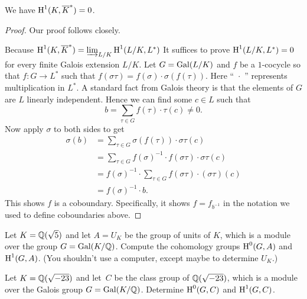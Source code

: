 \begin{theorem}[Hilbert 90]\label{thm:h90}
	We have $\operatorname{H}^1(K,\overline{K}^*) = 0$.
\end{theorem}
\begin{proof}
	Our proof follows \cite[pg.~150]{serre:localfields} closely.

	Because $\operatorname{H}^1(K,\overline{K}^*) = \varinjlim_{L/K} \operatorname{H}^1(L/K,L^*)$
	It suffices to prove $\operatorname{H}^1(L/K,L^*) = 0$ for every finite
	Galois extension $L/K$.
	Let $G = \operatorname{Gal}(L/K)$ and $f$ be a $1$-cocycle so that $f:G \to L^*$
	such that $f(\sigma\tau) = f(\sigma)\cdot\sigma(f(\tau))$. Here
	``~$\cdot$~'' represents multiplication in $L^*$.
	A standard fact from Galois theory is that the elements of
	$G$ are $L$ linearly independent. Hence we can find
	some $c\in L$ such that
	$$
	b = \sum_{\tau\in G} f(\tau)\cdot\tau(c) \neq 0.
	$$
	Now apply $\sigma$ to both sides to get
	\begin{align*}
		\sigma(b)
		&=
		\sum_{\tau\in G} \sigma(f(\tau)) \cdot \sigma\tau(c)
		\\
		&=
		\sum_{\tau\in G} f(\sigma)^{-1} \cdot f(\sigma\tau)
		\cdot \sigma\tau(c)
		\\
		&=
		f(\sigma)^{-1} \cdot \sum_{\tau\in G} f(\sigma\tau)
		\cdot (\sigma\tau)(c)
		\\
		&=
		f(\sigma)^{-1}\cdot b.
	\end{align*}
	This shows $f$ is a coboundary. Specifically, it shows
	$f = f_{b^{-1}}$ in the notation we used to define
	coboundaries above.
\end{proof}

\begin{exercise}
	Let $K=\mathbb{Q}(\sqrt{5})$ and let $A=U_K$ be the group of units of
	$K$, which is a module over the group $G=\operatorname{Gal}(K/\mathbb{Q})$.  Compute the
	cohomology groups $\operatorname{H}^0(G,A)$ and $\operatorname{H}^1(G,A)$.  (You shouldn't use
	a computer, except maybe to determine $U_K$.)
\end{exercise}

\begin{exercise}
	Let $K=\mathbb{Q}(\sqrt{-23})$ and let~$C$ be the class group of
	$\mathbb{Q}(\sqrt{-23})$, which is a module over the Galois group $G=\operatorname{Gal}(K/\mathbb{Q})$. 
	Determine $\operatorname{H}^0(G,C)$ and $\operatorname{H}^1(G,C)$.
\end{exercise}


